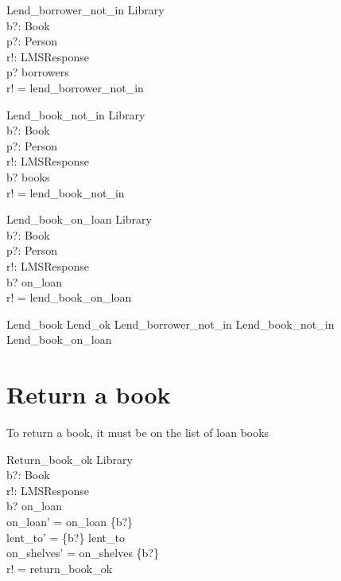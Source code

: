 \documentclass[11pt, fuzz]{article}
\begin{document}
\begin{schema}{Lend\_borrower\_not\_in}
    \Xi Library  \\
    b?: Book        \\
    p?: Person      \\
    r!: LMSResponse \\
\where
    p? \notin borrowers          \\
    r! = lend\_borrower\_not\_in \\
\end{schema}

\begin{schema}{Lend\_book\_not\_in}
    \Xi Library  \\
    b?: Book        \\
    p?: Person      \\
    r!: LMSResponse \\
\where
    b? \notin books          \\
    r! = lend\_book\_not\_in \\
\end{schema}

\begin{schema}{Lend\_book\_on\_loan}
    \Xi Library  \\
    b?: Book        \\
    p?: Person      \\
    r!: LMSResponse \\
\where
    b? \in on\_loan          \\
    r! = lend\_book\_on\_loan \\
\end{schema}


\begin{zed}
    Lend\_book  Lend\_ok \lor Lend\_borrower\_not\_in \lor Lend\_book\_not\_in \lor \\ Lend\_book\_on\_loan
\end{zed}

\section{Return a book}

To return a book, it must be on the list of loan books

\begin{schema}{Return\_book\_ok}
    \Delta Library  \\
    b?: Book        \\
    r!: LMSResponse \\
\where
    b? \in on\_loan                        \\
    on\_loan' = on\_loan \setminus \{b?\}  \\
    lent\_to' = \{b?\} \ndres lent\_to     \\
    on\_shelves' = on\_shelves \cup \{b?\} \\
    r! = return\_book\_ok                   \\
\end{schema}
\end{document}
